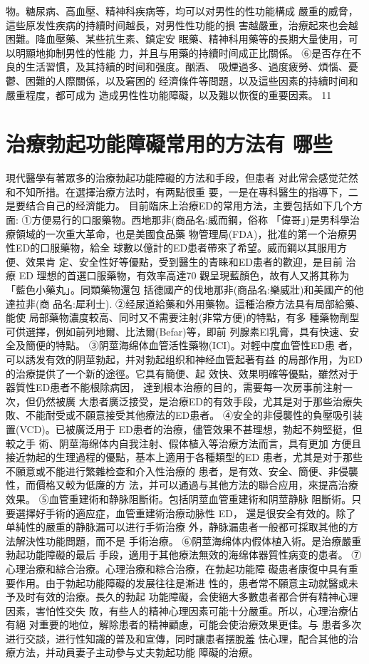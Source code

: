 \documentclass[12pt,UTF8]{ctexbook}
\begin{document}
物。糖尿病、高血壓、精神科疾病等，均可以对男性的性功能構成
嚴重的威脅，這些原发性疾病的持續时间越長，对男性性功能的損
害越嚴重，治療起來也会越困難。降血壓藥、某些抗生素、鎮定安
眠藥、精神科用藥等的長期大量使用，可以明顯地抑制男性的性能
力，并且与用藥的持續时间成正比關係。
⑥是否存在不良的生活習慣，及其持續的时间和强度。酗酒、
吸煙過多、過度疲勞、煩惱、憂鬱、困難的人際關係，以及窘困的
经濟條件等問題，以及這些因素的持續时间和嚴重程度，都可成为
造成男性性功能障礙，以及難以恢復的重要因素。
11\section{治療勃起功能障礙常用的方法有
哪些}
現代醫學有著眾多的治療勃起功能障礙的方法和手段，但患者
对此常会感觉茫然和不知所措。在選擇治療方法时，有两點很重
要，一是在專科醫生的指導下，二是要结合自己的经濟能力。
目前臨床上治療ED的常用方法，主要包括如下几个方面:
①方便易行的口服藥物。西地那非(商品名:威而鋼，俗称
「偉哥」)是男科學治療領域的一次重大革命，也是美國食品藥
物管理局(FDA)，批准的第一个治療男性ED的口服藥物，給全
球數以億計的ED患者帶來了希望。威而鋼以其服用方便、效果肯
定、安全性好等優點，受到醫生的青睐和ED患者的歡迎，是目前
治療 ED 理想的首選口服藥物，有效率高達70%
觀呈現藍顏色，故有人又將其称为「藍色小藥丸」。同類藥物還包
括德國产的伐地那非(商品名:樂威壯)和美國产的他達拉非(商
品名:犀利士).
②经尿道給藥和外用藥物。這種治療方法具有局部給藥、能使
局部藥物濃度較高、同时又不需要注射(非常方便)的特點，有多
種藥物劑型可供選擇，例如前列地爾、比法爾(Befar)等，即前
列腺素El乳膏，具有快速、安全及簡便的特點。
③阴莖海绵体血管活性藥物(ICI)。对輕中度血管性ED患
者，可以誘发有效的阴莖勃起，并对勃起组织和神经血管起著有益
的局部作用，为ED的治療提供了一个新的途徑。它具有簡便、起
效快、效果明確等優點，雖然对于器質性ED患者不能根除病因，
達到根本治療的目的，需要每一次房事前注射一次，但仍然被廣
大患者廣泛接受，是治療ED的有效手段，尤其是对于那些治療失
敗、不能耐受或不願意接受其他療法的ED患者。
④安全的非侵襲性的負壓吸引装置(VCD)。已被廣泛用于
ED患者的治療，儘管效果不甚理想，勃起不夠堅挺，但較之手
術、阴莖海绵体内自我注射、假体植入等治療方法而言，具有更加
方便且接近勃起的生理過程的優點，基本上適用于各種類型的ED
患者，尤其是对于那些不願意或不能进行繁雜检查和介入性治療的
患者，是有效、安全、簡便、非侵襲性，而價格又較为低廉的方
法，并可以通過与其他方法的聯合应用，來提高治療效果。
⑤血管重建術和静脉阻斷術。包括阴莖血管重建術和阴莖静脉
阻斷術。只要選擇好手術的適应症，血管重建術治療动脉性 ED，
還是很安全有效的。除了单純性的嚴重的静脉漏可以进行手術治療
外，静脉漏患者一般都可採取其他的方法解決性功能問題，而不是
手術治療。
⑥阴莖海绵体内假体植入術。是治療嚴重勃起功能障礙的最后
手段，適用于其他療法無效的海绵体器質性病变的患者。
⑦心理治療和綜合治療。心理治療和粽合治療，在勃起功能障
礙患者康復中具有重要作用。由于勃起功能障礙的发展往往是漸进
性的，患者常不願意主动就醫或未予及时有效的治療。長久的勃起
功能障礙，会使絕大多數患者都合併有精神心理因素，害怕性交失
敗，有些人的精神心理因素可能十分嚴重。所以，心理治療佔有絕
对重要的地位，解除患者的精神顧慮，可能会使治療效果更佳。与
患者多次进行交談，进行性知識的普及和宣傳，同时讓患者摆脫羞
怯心理，配合其他的治療方法，并动員妻子主动參与丈夫勃起功能
障礙的治療。
\end{document}

